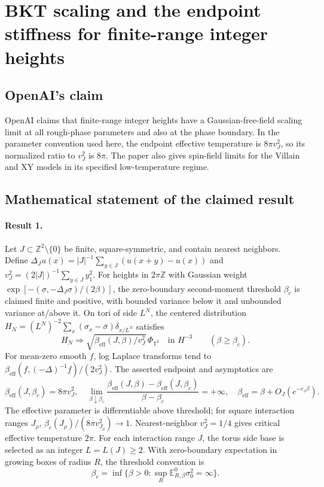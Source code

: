 \documentclass[11pt]{article}
\begin{document}
\section*{BKT scaling and the endpoint stiffness for finite-range integer heights}

\subsection{OpenAI's claim}
OpenAI claims that finite-range integer heights have a Gaussian-free-field scaling limit at all rough-phase parameters and also at the phase boundary. In the parameter convention used here, the endpoint effective temperature is $8\pi v_J^2$, so its normalized ratio to $v_J^2$ is $8\pi$. The paper also gives spin-field limits for the Villain and XY models in its specified low-temperature regime.

\subsection{Mathematical statement of the claimed result}
\paragraph{Result 1.} Let \(J\subset\mathbb Z^2\setminus\{0\}\) be finite, square-symmetric, and contain nearest neighbors. Define \(\Delta_Ju(x)=|J|^{-1}\sum_{y\in J}(u(x+y)-u(x))\) and \(v_J^2=(2|J|)^{-1}\sum_{y\in J}y_1^2\). For heights in \(2\pi\mathbb Z\) with Gaussian weight \(\exp[-(\sigma,-\Delta_J\sigma)/(2\beta)]\), the zero-boundary second-moment threshold \(\beta_c\) is claimed finite and positive, with bounded variance below it and unbounded variance at/above it. On tori of side \(L^N\), the centered distribution \(H_N=(L^N)^{-2}\sum_x(\sigma_x-\bar\sigma)\delta_{x/L^N}\) satisfies
\[
 H_N\Longrightarrow\sqrt{\beta_{\mathrm{eff}}(J,\beta)/v_J^2}\,\Phi_{\mathbb T^2}
 \quad\text{in }H^{-3}\qquad(\beta\ge\beta_c).
\]
For mean-zero smooth \(f\), log Laplace transforms tend to \(\beta_{\mathrm{eff}}(f,(-\Delta)^{-1}f)/(2v_J^2)\). The asserted endpoint and asymptotics are
\[
 \beta_{\mathrm{eff}}(J,\beta_c)=8\pi v_J^2,\quad
 \lim_{\beta\downarrow\beta_c}\frac{\beta_{\mathrm{eff}}(J,\beta)-\beta_{\mathrm{eff}}(J,\beta_c)}{\beta-\beta_c}=+\infty,
 \quad\beta_{\mathrm{eff}}=\beta+O_J(e^{-c_J\beta}).
\]
The effective parameter is differentiable above threshold; for square interaction ranges \(J_\rho\), \(\beta_c(J_\rho)/(8\pi v_{J_\rho}^2)\to1\). Nearest-neighbor \(v_J^2=1/4\) gives critical effective temperature \(2\pi\). For each interaction range $J$, the torus side base is selected as an integer $L=L(J)\ge2$. With zero-boundary expectation in growing boxes of radius $R$, the threshold convention is
\[
 \beta_c=\inf\{\beta>0:\sup_R\mathbb E_{R,\beta}^{0}\sigma_0^2=\infty\}.
\]
\end{document}
